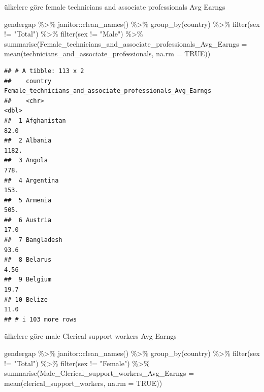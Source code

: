 \documentclass[
]{article}
\newenvironment{Shaded}{\begin{snugshade}}{\end{snugshade}}
\newcommand{\AttributeTok}[1]{\textcolor[rgb]{0.77,0.63,0.00}{#1}}
\newcommand{\ConstantTok}[1]{\textcolor[rgb]{0.00,0.00,0.00}{#1}}
\newcommand{\FunctionTok}[1]{\textcolor[rgb]{0.00,0.00,0.00}{#1}}
\newcommand{\NormalTok}[1]{#1}
\newcommand{\SpecialCharTok}[1]{\textcolor[rgb]{0.00,0.00,0.00}{#1}}
\newcommand{\StringTok}[1]{\textcolor[rgb]{0.31,0.60,0.02}{#1}}
\begin{document}
ülkelere göre female technicians and associate professionals Avg Earngs

\begin{Shaded}
\begin{Highlighting}[]
\NormalTok{gendergap }\SpecialCharTok{\%\textgreater{}\%}
\NormalTok{  janitor}\SpecialCharTok{::}\FunctionTok{clean\_names}\NormalTok{() }\SpecialCharTok{\%\textgreater{}\%}
  \FunctionTok{group\_by}\NormalTok{(country) }\SpecialCharTok{\%\textgreater{}\%} 
  \FunctionTok{filter}\NormalTok{(sex }\SpecialCharTok{!=} \StringTok{"Total"}\NormalTok{) }\SpecialCharTok{\%\textgreater{}\%}
  \FunctionTok{filter}\NormalTok{(sex }\SpecialCharTok{!=} \StringTok{"Male"}\NormalTok{) }\SpecialCharTok{\%\textgreater{}\%}
  \FunctionTok{summarise}\NormalTok{(}\AttributeTok{Female\_technicians\_and\_associate\_professionals\_Avg\_Earngs =} \FunctionTok{mean}\NormalTok{(technicians\_and\_associate\_professionals, }\AttributeTok{na.rm =} \ConstantTok{TRUE}\NormalTok{))}
\end{Highlighting}
\end{Shaded}

\begin{verbatim}
## # A tibble: 113 x 2
##    country     Female_technicians_and_associate_professionals_Avg_Earngs
##    <chr>                                                           <dbl>
##  1 Afghanistan                                                     82.0 
##  2 Albania                                                       1182.  
##  3 Angola                                                         778.  
##  4 Argentina                                                      153.  
##  5 Armenia                                                        505.  
##  6 Austria                                                         17.0 
##  7 Bangladesh                                                      93.6 
##  8 Belarus                                                          4.56
##  9 Belgium                                                         19.7 
## 10 Belize                                                          11.0 
## # i 103 more rows
\end{verbatim}

ülkelere göre male Clerical support workers Avg Earngs

\begin{Shaded}
\begin{Highlighting}[]
\NormalTok{gendergap }\SpecialCharTok{\%\textgreater{}\%}
\NormalTok{  janitor}\SpecialCharTok{::}\FunctionTok{clean\_names}\NormalTok{() }\SpecialCharTok{\%\textgreater{}\%}
  \FunctionTok{group\_by}\NormalTok{(country) }\SpecialCharTok{\%\textgreater{}\%} 
   \FunctionTok{filter}\NormalTok{(sex }\SpecialCharTok{!=} \StringTok{"Total"}\NormalTok{) }\SpecialCharTok{\%\textgreater{}\%}
  \FunctionTok{filter}\NormalTok{(sex }\SpecialCharTok{!=} \StringTok{"Female"}\NormalTok{) }\SpecialCharTok{\%\textgreater{}\%}
  \FunctionTok{summarise}\NormalTok{(}\AttributeTok{Male\_Clerical\_support\_workers\_Avg\_Earngs =} \FunctionTok{mean}\NormalTok{(clerical\_support\_workers, }\AttributeTok{na.rm =} \ConstantTok{TRUE}\NormalTok{))}
\end{Highlighting}
\end{Shaded}
\end{document}
